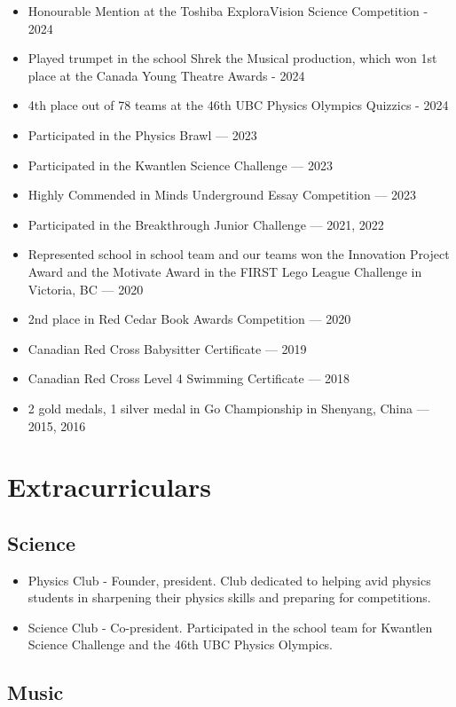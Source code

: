 \documentclass{article}
\begin{document}
\begin{itemize}
	\item Honourable Mention at the Toshiba ExploraVision Science Competition - 2024
	\item Played trumpet in the school Shrek the Musical production, which won 1st place at the Canada Young Theatre Awards - 2024
	\item 4th place out of 78 teams at the 46th UBC Physics Olympics Quizzics - 2024
	\item Participated in the Physics Brawl — 2023
	\item Participated in the Kwantlen Science Challenge — 2023
	\item Highly Commended in Minds Underground Essay Competition — 2023
	\item Participated in the Breakthrough Junior Challenge — 2021, 2022
	\item Represented school in school team and our teams won the Innovation Project Award and the Motivate Award in the FIRST Lego League Challenge in Victoria, BC — 2020
	\item 2nd place in Red Cedar Book Awards Competition — 2020
	\item Canadian Red Cross Babysitter Certificate — 2019
	\item Canadian Red Cross Level 4 Swimming Certificate — 2018
	\item 2 gold medals, 1 silver medal in Go Championship in Shenyang, China — 2015, 2016
\end{itemize}

\section*{Extracurriculars}

\subsection*{Science}

\begin{itemize}
	\item Physics Club - Founder, president. Club dedicated to helping avid physics students in sharpening their physics skills and preparing for competitions.
	\item Science Club - Co-president. Participated in the school team for Kwantlen Science Challenge and the 46th UBC Physics Olympics.
\end{itemize}

\subsection*{Music}
\end{document}

